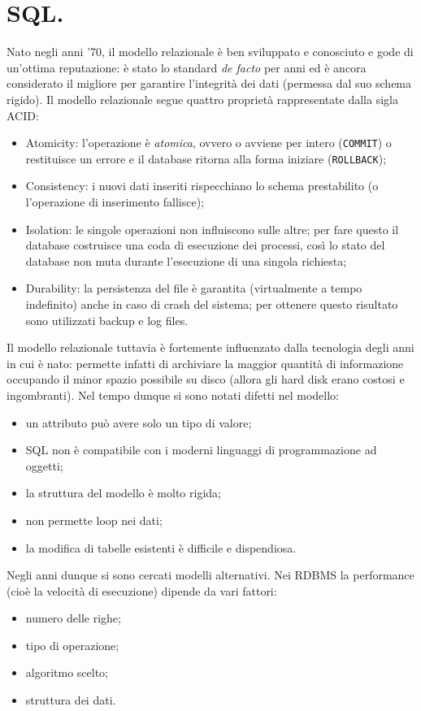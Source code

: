\documentclass[a4page, 11pt]{article}
\begin{document}
\section{SQL.}
Nato negli anni '70, il modello relazionale è ben sviluppato e conosciuto e gode di un'ottima reputazione: è stato lo standard \textit{de facto} per anni ed è ancora considerato il migliore per garantire l'integrità dei dati (permessa dal suo schema rigido).
Il modello relazionale segue quattro proprietà rappresentate dalla sigla ACID:
\begin{itemize}
\item Atomicity: l'operazione è \textit{atomica}, ovvero o avviene per intero (\verb|COMMIT|) o restituisce un errore e il database ritorna alla forma iniziare (\verb|ROLLBACK|);
\item Consistency: i nuovi dati inseriti rispecchiano lo schema prestabilito (o l'operazione di inserimento fallisce);
\item Isolation: le singole operazioni non influiscono sulle altre; per fare questo il database costruisce una coda di esecuzione dei processi, così lo stato del database non muta durante l'esecuzione di una singola richiesta;
\item Durability: la persistenza del file è garantita (virtualmente a tempo indefinito) anche in caso di crash del sistema; per ottenere questo risultato sono utilizzati backup e log files.
\end{itemize}

Il modello relazionale tuttavia è fortemente influenzato dalla tecnologia degli anni in cui è nato: permette infatti di archiviare la maggior quantità di informazione occupando il minor spazio possibile su disco (allora gli hard disk erano costosi e ingombranti).
Nel tempo dunque si sono notati difetti nel modello:
\begin{itemize}[noitemsep]
\item un attributo può avere solo un tipo di valore;
\item SQL non è compatibile con i moderni linguaggi di programmazione ad oggetti;
\item la struttura del modello è molto rigida;
\item non permette loop nei dati;
\item la modifica di tabelle esistenti è difficile e dispendiosa.
\end{itemize}

Negli anni dunque si sono cercati modelli alternativi.
Nei RDBMS la performance (cioè la velocità di esecuzione) dipende da vari fattori:
\begin{itemize}
\item numero delle righe;
\item tipo di operazione;
\item algoritmo scelto;
\item struttura dei dati.
\end{itemize}
\end{document}
